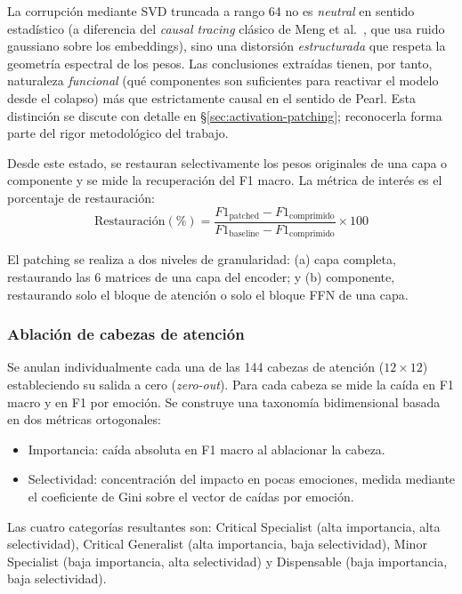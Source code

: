 La corrupción mediante SVD truncada a rango 64 no es
\emph{neutral} en sentido estadístico (a diferencia del \emph{causal tracing}
clásico de Meng et al.\ \cite{meng2022locating}, que usa ruido gaussiano
sobre los embeddings), sino una distorsión \emph{estructurada} que respeta
la geometría espectral de los pesos. Las conclusiones extraídas tienen,
por tanto, naturaleza \emph{funcional} (qué componentes son
suficientes para reactivar el modelo desde el colapso) más que estrictamente
causal en el sentido de Pearl. Esta distinción se discute con detalle en
\S\ref{sec:activation-patching}; reconocerla forma parte del rigor
metodológico del trabajo.

Desde este estado, se restauran selectivamente los pesos originales de una
capa o componente y se mide la recuperación del F1 macro. La métrica de
interés es el porcentaje de restauración:
\begin{equation}
    \text{Restauración}(\%) = \frac{F1_{\text{patched}} - F1_{\text{comprimido}}}{F1_{\text{baseline}} - F1_{\text{comprimido}}} \times 100
    \label{eq:restauracion}
\end{equation}

El patching se realiza a dos niveles de granularidad: (a) capa completa,
restaurando las 6 matrices de una capa del encoder; y (b) componente,
restaurando solo el bloque de atención o solo el bloque FFN de una capa.

\subsubsection{Ablación de cabezas de atención}
\label{sec:met-ablacion}

Se anulan individualmente cada una de las 144 cabezas de atención ($12 \times 12$)
estableciendo su salida a cero (\textit{zero-out}). Para cada cabeza se mide la
caída en F1 macro y en F1 por emoción. Se construye una taxonomía bidimensional
basada en dos métricas ortogonales:

\begin{itemize}[nosep]
    \item Importancia: caída absoluta en F1 macro al ablacionar la cabeza.
    \item Selectividad: concentración del impacto en pocas emociones, medida
    mediante el coeficiente de Gini sobre el vector de caídas por emoción.
\end{itemize}

Las cuatro categorías resultantes son: Critical Specialist (alta importancia, alta
selectividad), Critical Generalist (alta importancia, baja selectividad), Minor
Specialist (baja importancia, alta selectividad) y Dispensable (baja importancia,
baja selectividad).

